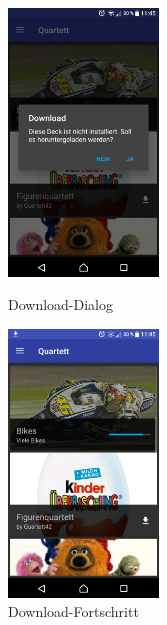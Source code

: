 \documentclass{scrartcl}
\begin{document}
\begin{figure}
  \centering
  \begin{minipage}{0.45\textwidth}
    \centering
    \includegraphics[width=4cm]{img/gallery_dialog.png}
    \caption{Download-Dialog}
  \end{minipage}
  \hfill
  \begin{minipage}{0.45\textwidth}
    \centering
    \includegraphics[width=4cm]{img/gallery_download.png}
    \caption{Download-Fortschritt}
  \end{minipage}
\end{figure}
\end{document}
